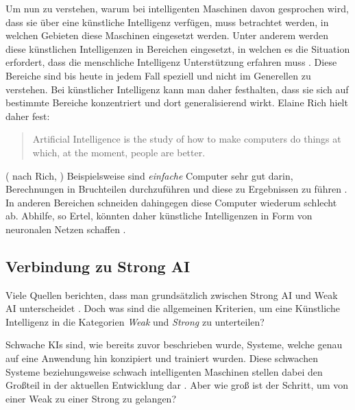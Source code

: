             Um nun zu verstehen, warum bei intelligenten Maschinen davon gesprochen wird, dass sie über eine
            künstliche Intelligenz verfügen, muss betrachtet werden, in welchen Gebieten diese Maschinen eingesetzt werden.
            Unter anderem werden diese künstlichen Intelligenzen in Bereichen eingesetzt, in welchen es die Situation
            erfordert, dass die menschliche Intelligenz Unterstützung erfahren muss \cite[s. 2]{ertel2016grundkurs}.
            Diese Bereiche sind bis heute in jedem Fall speziell und nicht im Generellen zu verstehen. Bei künstlicher
            Intelligenz kann man daher festhalten, dass sie sich auf bestimmte Bereiche konzentriert und dort
            generalisierend wirkt. Elaine Rich hielt daher fest:
            \begin{quote}
                Artificial Intelligence is the study of how to make computers do things at which, at the moment, people are better.
            \end{quote}
            (\citeauthor{ertel2016grundkurs} nach Rich, \citeyear{ertel2016grundkurs})
            Beispielsweise sind \textit{einfache} Computer sehr gut darin, Berechnungen in Bruchteilen durchzuführen und diese zu
            Ergebnissen zu führen \cite[s. 3]{ertel2016grundkurs}.
            In anderen Bereichen schneiden dahingegen diese Computer wiederum schlecht ab. Abhilfe, so Ertel,
            könnten daher künstliche Intelligenzen in Form von neuronalen Netzen schaffen \citeyearpar{ertel2016grundkurs}.

        \subsection{Verbindung zu Strong AI}
            Viele Quellen berichten, dass man grundsätzlich zwischen Strong AI und Weak AI unterscheidet \cite{huang_beef}.
            Doch was sind die allgemeinen Kriterien, um eine Künstliche Intelligenz in die Kategorien \textit{Weak}
            und \textit{Strong} zu unterteilen?

            Schwache KIs sind, wie bereits zuvor beschrieben wurde, Systeme, welche genau auf eine Anwendung hin
            konzipiert und trainiert wurden. Diese schwachen Systeme beziehungsweise schwach intelligenten Maschinen
            stellen dabei den Großteil in der aktuellen Entwicklung dar \cite{brendel_2019}. Aber wie groß ist der
            Schritt, um von einer Weak zu einer Strong zu gelangen?

